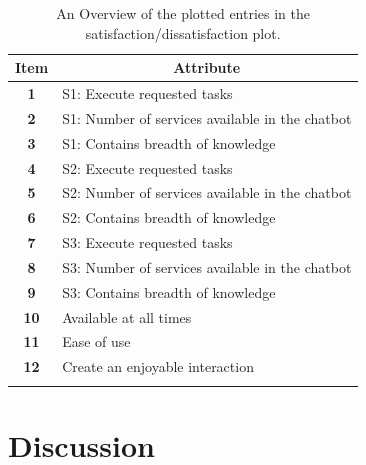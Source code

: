 \begin{longtable}{|c|l|}
	\hline
	\textbf{Item} & \multicolumn{1}{c|}{\textbf{Attribute}}         \\ \hline
	\endfirsthead
	\endhead
	\textbf{1}    & S1: Execute requested tasks                     \\ \hline
	\textbf{2}    & S1: Number of services available in the chatbot \\ \hline
	\textbf{3}    & S1: Contains breadth of knowledge               \\ \hline
	\textbf{4}    & S2: Execute requested tasks                     \\ \hline
	\textbf{5}    & S2: Number of services available in the chatbot \\ \hline
	\textbf{6}    & S2: Contains breadth of knowledge               \\ \hline
	\textbf{7}    & S3: Execute requested tasks                     \\ \hline
	\textbf{8}    & S3: Number of services available in the chatbot \\ \hline
	\textbf{9}    & S3: Contains breadth of knowledge               \\ \hline
	\textbf{10}   & Available at all times                          \\ \hline
	\textbf{11}   & Ease of use                                     \\ \hline
	\textbf{12}   & Create an enjoyable interaction                 \\ \hline
	\caption{An Overview of the plotted entries in the satisfaction/dissatisfaction plot.}
	\label{tab:kanoSatisfactionDissatisfactionTable}
\end{longtable}
\FloatBarrier
\FloatBarrier
\section{Discussion}

